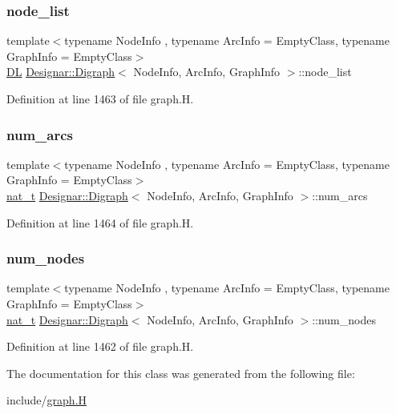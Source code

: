 \subsubsection{\texorpdfstring{node\+\_\+list}{node\_list}}
{\footnotesize\ttfamily template$<$typename Node\+Info , typename Arc\+Info  = Empty\+Class, typename Graph\+Info  = Empty\+Class$>$ \\
\hyperlink{class_designar_1_1_d_l}{DL} \hyperlink{class_designar_1_1_digraph}{Designar\+::\+Digraph}$<$ Node\+Info, Arc\+Info, Graph\+Info $>$\+::node\+\_\+list\hspace{0.3cm}{\ttfamily [protected]}}



Definition at line 1463 of file graph.\+H.

\mbox{\label{class_designar_1_1_digraph_accd2da6bdb5bc0624e7f79c904c89328}} 
\subsubsection{\texorpdfstring{num\+\_\+arcs}{num\_arcs}}
{\footnotesize\ttfamily template$<$typename Node\+Info , typename Arc\+Info  = Empty\+Class, typename Graph\+Info  = Empty\+Class$>$ \\
\hyperlink{namespace_designar_aa72662848b9f4815e7bf31a7cf3e33d1}{nat\+\_\+t} \hyperlink{class_designar_1_1_digraph}{Designar\+::\+Digraph}$<$ Node\+Info, Arc\+Info, Graph\+Info $>$\+::num\+\_\+arcs\hspace{0.3cm}{\ttfamily [protected]}}



Definition at line 1464 of file graph.\+H.

\mbox{\label{class_designar_1_1_digraph_a468cec4048ff9042a288dca47ad856aa}} 
\subsubsection{\texorpdfstring{num\+\_\+nodes}{num\_nodes}}
{\footnotesize\ttfamily template$<$typename Node\+Info , typename Arc\+Info  = Empty\+Class, typename Graph\+Info  = Empty\+Class$>$ \\
\hyperlink{namespace_designar_aa72662848b9f4815e7bf31a7cf3e33d1}{nat\+\_\+t} \hyperlink{class_designar_1_1_digraph}{Designar\+::\+Digraph}$<$ Node\+Info, Arc\+Info, Graph\+Info $>$\+::num\+\_\+nodes\hspace{0.3cm}{\ttfamily [protected]}}



Definition at line 1462 of file graph.\+H.



The documentation for this class was generated from the following file\+:\begin{DoxyCompactItemize}
\item 
include/\hyperlink{graph_8_h}{graph.\+H}\end{DoxyCompactItemize}
